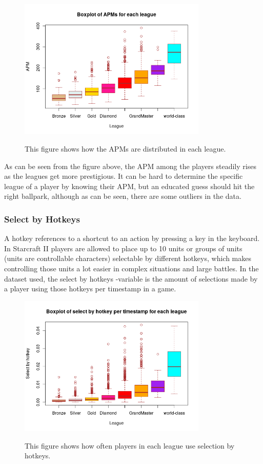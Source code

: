 \documentclass{article}
\begin{document}
\begin{figure} [H]
    \centering
    \includegraphics[width=0.8\textwidth]{apm_boxplot.png}
    \label{figure:figure:apm-boxplot}
    \caption{This figure shows how the APMs are distributed in each league.}
\end{figure}

As can be seen from the figure above, the APM among the players steadily rises as the leagues get more prestigious. It can be hard to determine the specific league of a player by knowing their APM, but an educated guess should hit the right ballpark, although as can be seen, there are some outliers in the data.

\subsubsection{Select by Hotkeys}
A hotkey references to a shortcut to an action by pressing a key in the keyboard. In Starcraft II players are allowed to place up to 10 units or groups of units (units are controllable characters) selectable by different hotkeys, which makes controlling those units a lot easier in complex situations and large battles. In the dataset used, the select by hotkeys -variable is the amount of selections made by a player using those hotkeys per timestamp in a game.

\begin{figure} [H]
    \centering
    \includegraphics[width=0.8\textwidth]{hotkey_boxplot.png}
    \label{figure:figure:hotkey-boxplot}
    \caption{This figure shows how often players in each league use selection by hotkeys.}
\end{figure}
\end{document}
